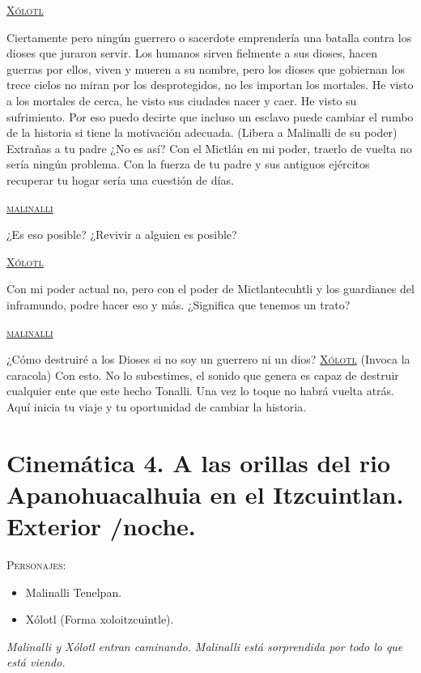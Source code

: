 \documentclass[11pt,letterpaper]{article}
\begin{document}
\begin{center}
	\par
\textsc{\underline{Xólotl}}
\\	
	\par
Ciertamente pero ningún guerrero o sacerdote emprendería una batalla contra los dioses que juraron servir. Los humanos sirven fielmente a sus dioses, hacen guerras por ellos, viven y mueren a su nombre, pero los dioses que gobiernan los trece cielos no miran por los desprotegidos, no les importan los mortales. He visto a los mortales de cerca, he visto sus ciudades nacer y caer. He visto su sufrimiento. Por eso puedo decirte que incluso un esclavo puede cambiar el rumbo de la historia si tiene la motivación adecuada.
(Libera a Malinalli de su poder)
Extrañas a tu padre ¿No es así? Con el Mictlán en mi poder, traerlo de vuelta no sería ningún problema. Con la fuerza de tu padre y sus antiguos ejércitos recuperar tu hogar sería una cuestión de días.  
\\	
	\par
\textsc{\underline{malinalli}}
\\	
	\par
¿Es eso posible? ¿Revivir a alguien es posible?
\\	
	\par
\textsc{\underline{Xólotl}}
\\	
	\par
Con mi poder actual no, pero con el poder de Mictlantecuhtli y los guardianes del inframundo, podre hacer eso y más. ¿Significa que tenemos un trato?
\\	
	\par
\textsc{\underline{malinalli}}
\\	
	\par
¿Cómo destruiré a los Dioses si no soy un guerrero ni un dios?
\textsc{\underline{Xólotl}}
(Invoca la caracola) Con esto. No lo subestimes, el sonido que genera es capaz de destruir cualquier ente que este hecho Tonalli. Una vez lo toque no habrá vuelta atrás. Aquí inicia tu viaje y tu oportunidad de cambiar la historia.
\end{center}

\section{Cinemática 4. A las orillas del rio Apanohuacalhuia en el Itzcuintlan. Exterior /noche.}
 \textsc{Personajes}:
\begin{itemize}
	\item Malinalli Tenelpan.
	\item Xólotl (Forma xoloitzcuintle).
\end{itemize}
\textit{Malinalli y Xólotl entran caminando. Malinalli está sorprendida por todo lo que está viendo.}
\end{document}
